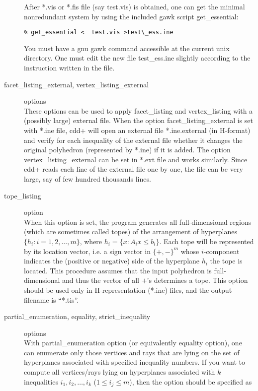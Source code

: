 \documentclass[11pt]{article}
\begin{document}
\begin{description}
After *.vis or *.fis file (say test.vis) is obtained,  
one can get the minimal nonredundant
system by using the included gawk script  get\_essential:
\begin{verbatim}
% get_essential <  test.vis >test\_ess.ine
\end{verbatim}
You must have a gnu gawk command accessible at
the current unix directory.  One must edit the new file
test\_ess.ine slightly according to the instruction
written in the file.

\item[facet\_listing\_external, vertex\_listing\_external] options\\
These options can be used to apply facet\_listing and vertex\_listing
with a (possibly large) external file.   When  the option facet\_listing\_external 
is set  with *.ine file, cdd+ will open an external file *.ine.external (in H-format)
and verify for each inequality of the external file whether it changes the 
original polyhedron  (represented by *.ine) if it is added.  The option
vertex\_listing\_external can be set in *.ext file and works similarly.
Since cdd+ reads each line of the external file one by one, the file
can be very large, say of few hundred thousands lines. 

\item[tope\_listing] option\\
When this option is set, the program generates all full-dimensional
regions (which are sometimes called topes) of the arrangement
of hyperplanes $\{ h_i : i = 1,2, \ldots, m \}$, where 
$ h_i = \{ x : A_i x \le b_i \}$.  Each tope will be
represented by its location vector, i.e. 
a sign vector in $\{+, -\} ^m$ whose $i$-component
indicates the (positive or negative) side of the hyperplane $h_i$
the tope is located.  This procedure assumes that the input
polyhedron is full-dimensional and thus the vector of all $+$'s
determines a tope.   This option should be used only in H-representation
(*.ine) files, and the output filename is ``*.tis''.


\item[partial\_enumeration, equality, strict\_inequality] options\\
With partial\_enumeration option (or equivalently equality option), 
one can enumerate only those
vertices and rays that are lying on the set of hyperplanes
associated with specified inequality numbers. If you want
to compute all vertices/rays lying on hyperplanes
associated with $k$ inequalities $i_1, i_2, \ldots, i_k$
($1 \le i_j \le m$), then
the option should be specified as


\end{description}
\end{document}
